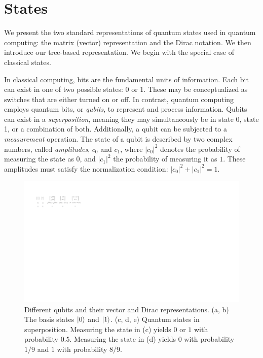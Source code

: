 \section{States} 

We present the two standard representations of quantum states used in quantum computing: the matrix (vector) representation and the Dirac notation.
%
We then introduce our tree-based representation.
%
We begin with the special case of classical states.

In classical computing, bits are the fundamental units of information. 
%
Each bit can exist in one of two possible states: 0 or 1. 
%
These may be conceptualized as switches that are either turned on or off. 
%
In contrast, quantum computing employs quantum bits, or {\it qubits}, to represent and process information. 
%
Qubits can exist in a {\it superposition}, meaning they may simultaneously be in state 0, state 1, or a combination of both. 
%
Additionally, a qubit can be subjected to a {\it measurement} operation. 
%
The state of a qubit is described by two complex numbers, called {\it amplitudes}, $c_0$ and $c_1$, where $|c_0|^2$ denotes the probability of measuring the state as $0$, and $|c_1|^2$ the probability of measuring it as $1$. 
%
These amplitudes must satisfy the normalization condition: $|c_0|^2 + |c_1|^2 = 1$.

\begin{figure}
\includegraphics[scale=0.85]{figures/States/states}
\caption{Different qubits and their vector and Dirac representations.
(a, b) The basis states $|0\rangle$ and $|1\rangle$.
(c, d, e) Quantum states in superposition.
%
Measuring the state in (c) yields $0$ or $1$ with probability $0.5$.
%
Measuring the state in (d) yields $0$ with probability $1/9$ and $1$ with probability $8/9$.
}
\label{qbit:state:fig}
\end{figure}

